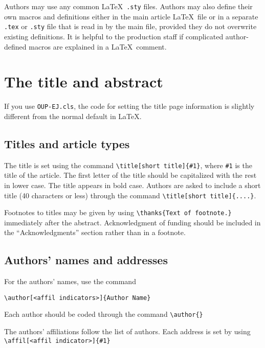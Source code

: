 \documentclass{OUP-EJ}
\begin{document}
Authors may use any common \LaTeX\ \verb".sty" files.
Authors may also define their own macros and definitions either in the main article \LaTeX\ file
or in a separate \verb".tex" or \verb".sty" file that is read in by the
main file, provided they do not overwrite existing definitions.
It is helpful to the production staff if complicated author-defined macros are explained in a \LaTeX\ comment.

\section{The title and abstract}

If you use \verb"OUP-EJ.cls", the code for setting the title page information is slightly different from
the normal default in \LaTeX.

\subsection{Titles and article types}

The title is set using the command
\verb"\title[short title]{#1}", where \verb"#1" is the title of the article. The
first letter of the title should be capitalized with the rest in lower case.
The title appears in bold case. Authors are asked to include a short title (40 characters or less) through the command \verb+\title[short title]{....}+.\bigskip

\noindent Footnotes to titles may be given by using \verb"\thanks{Text of footnote.}" immediately after the abstract.
Acknowledgment of funding should be included in the ``Acknowledgments'' section rather than in a footnote.

\clearpage

\subsection{Authors' names and addresses}

For the authors' names, use the command
\medskip

\noindent
\verb"\author[<affil indicators>]{Author Name}"
\medskip

\noindent
Each author should be coded through the command \verb"\author{}"
\bigskip

\noindent The authors' affiliations follow the list of authors.
Each address is set by using\newline
\verb"\affil[<affil indicator>]{#1}"
\bigskip
\end{document}
